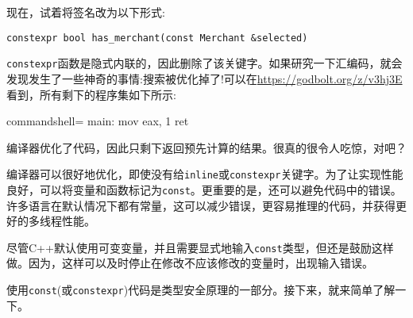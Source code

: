 现在，试着将签名改为以下形式:

\begin{lstlisting}[style=styleCXX]
constexpr bool has_merchant(const Merchant &selected)
\end{lstlisting}

\texttt{constexpr}函数是隐式内联的，因此删除了该关键字。如果研究一下汇编码，就会发现发生了一些神奇的事情:搜索被优化掉了!可以在\url{https://godbolt.org/z/v3hj3E}看到，所有剩下的程序集如下所示:

\begin{tcblisting}{commandshell={}}
main:
    mov eax, 1
    ret
\end{tcblisting}

编译器优化了代码，因此只剩下返回预先计算的结果。很真的很令人吃惊，对吧？


编译器可以很好地优化，即使没有给\texttt{inline}或\texttt{constexpr}关键字。为了让实现性能良好，可以将变量和函数标记为\texttt{const}。更重要的是，还可以避免代码中的错误。许多语言在默认情况下都有常量，这可以减少错误，更容易推理的代码，并获得更好的多线程性能。

尽管C++默认使用可变变量，并且需要显式地输入\texttt{const}类型，但还是鼓励这样做。因为，这样可以及时停止在修改不应该修改的变量时，出现输入错误。

使用\texttt{const}(或\texttt{constexpr})代码是类型安全原理的一部分。接下来，就来简单了解一下。











